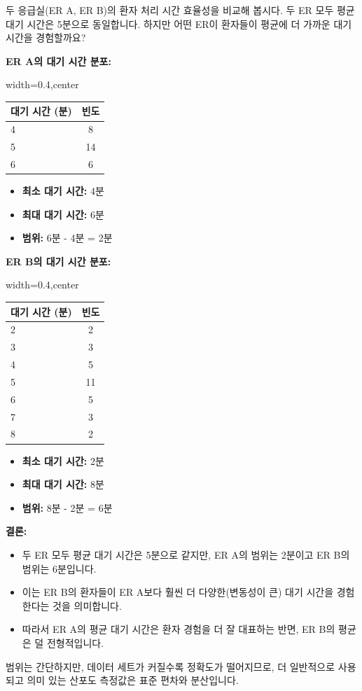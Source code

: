 \documentclass[11pt,a4paper]{article}
\theoremstyle{definition}
\begin{document}
\begin{examplebox}[title=예시: 응급실 (ER) 대기 시간 비교]
두 응급실(ER A, ER B)의 환자 처리 시간 효율성을 비교해 봅시다. 두 ER 모두 평균 대기 시간은 5분으로 동일합니다.
하지만 어떤 ER이 환자들이 평균에 더 가까운 대기 시간을 경험할까요?

\textbf{ER A의 대기 시간 분포:}
\begin{adjustbox}{width=0.4\textwidth,center}
\begin{tabular}{lc}
\toprule
\textbf{대기 시간 (분)} & \textbf{빈도} \\
\midrule
4 & 8 \\
5 & 14 \\
6 & 6 \\
\bottomrule
\end{tabular}
\end{adjustbox}
\label{tab:er_a_waiting_time}
\begin{itemize}
    \item \textbf{최소 대기 시간:} 4분
    \item \textbf{최대 대기 시간:} 6분
    \item \textbf{범위:} 6분 - 4분 = 2분
\end{itemize}

\textbf{ER B의 대기 시간 분포:}
\begin{adjustbox}{width=0.4\textwidth,center}
\begin{tabular}{lc}
\toprule
\textbf{대기 시간 (분)} & \textbf{빈도} \\
\midrule
2 & 2 \\
3 & 3 \\
4 & 5 \\
5 & 11 \\
6 & 5 \\
7 & 3 \\
8 & 2 \\
\bottomrule
\end{tabular}
\end{adjustbox}
\label{tab:er_b_waiting_time}
\begin{itemize}
    \item \textbf{최소 대기 시간:} 2분
    \item \textbf{최대 대기 시간:} 8분
    \item \textbf{범위:} 8분 - 2분 = 6분
\end{itemize}

\textbf{결론:}
\begin{itemize}
    \item 두 ER 모두 평균 대기 시간은 5분으로 같지만, ER A의 범위는 2분이고 ER B의 범위는 6분입니다.
    \item 이는 ER B의 환자들이 ER A보다 훨씬 더 다양한(변동성이 큰) 대기 시간을 경험한다는 것을 의미합니다.
    \item 따라서 ER A의 평균 대기 시간은 환자 경험을 더 잘 대표하는 반면, ER B의 평균은 덜 전형적입니다.
\end{itemize}
범위는 간단하지만, 데이터 세트가 커질수록 정확도가 떨어지므로, 더 일반적으로 사용되고 의미 있는 산포도 측정값은 표준 편차와 분산입니다.
\end{examplebox}
\end{document}
